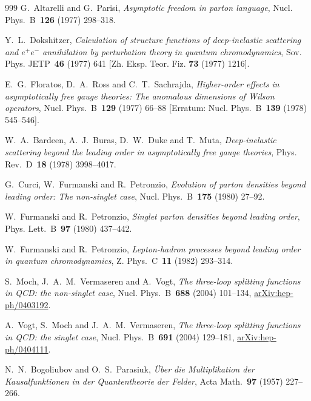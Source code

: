 \begin{thebibliography}{999}
G.~Altarelli and G.~Parisi, \emph{Asymptotic freedom in parton language}, Nucl. Phys.~B~\textbf{126} (1977) \mbox{298--318}.

Y.~L.~Dokshitzer, \emph{Calculation of structure functions of deep-inelastic scattering and $e^+e^-$ annihilation by perturbation theory in quantum chromodynamics}, Sov. Phys. JETP~\textbf{46} (1977) \mbox{641} [Zh. Eksp. Teor. Fiz. \textbf{73} (1977) \mbox{1216}].

E.~G.~Floratos, D.~A.~Ross and C.~T.~Sachrajda, \emph{Higher-order effects in asymptotically free gauge theories: The anomalous dimensions of Wilson operators}, Nucl. Phys.~B~\textbf{129} (1977) \mbox{66--88} [Erratum: Nucl. Phys.~B~\textbf{139} (1978) \mbox{545--546}].

W.~A.~Bardeen, A.~J.~Buras, D.~W.~Duke and T.~Muta, \emph{Deep-inelastic scattering beyond the leading order in asymptotically free gauge theories}, Phys. Rev.~D~\textbf{18} (1978) \mbox{3998--4017}.

G.~Curci, W.~Furmanski and R.~Petronzio, \emph{Evolution of parton densities beyond leading order: The non-singlet case}, Nucl. Phys.~B~\textbf{175} (1980) \mbox{27--92}.

W.~Furmanski and R.~Petronzio, \emph{Singlet parton densities beyond leading order}, Phys. Lett.~B~\textbf{97} (1980) \mbox{437--442}.

W.~Furmanski and R.~Petronzio, \emph{Lepton-hadron processes beyond leading order in quantum chromodynamics}, Z. Phys.~C~\textbf{11} (1982) \mbox{293--314}.

S.~Moch, J.~A.~M.~Vermaseren and A.~Vogt, \emph{The three-loop splitting functions in QCD: the non-singlet case}, Nucl. Phys.~B~\textbf{688} (2004) \mbox{101--134}, \href{https://arxiv.org/abs/hep-ph/0403192}{arXiv:hep-ph/0403192}.

A.~Vogt, S.~Moch and J.~A.~M.~Vermaseren, \emph{The three-loop splitting functions in QCD: the singlet case}, Nucl. Phys.~B~\textbf{691} (2004) \mbox{129--181}, \href{https://arxiv.org/abs/hep-ph/0404111}{arXiv:hep-ph/0404111}.

N.~N.~Bogoliubov and O.~S.~Parasiuk, \emph{{\"U}ber die Multiplikation der Kausalfunktionen in der Quantentheorie der Felder}, Acta Math.~\textbf{97} (1957) \mbox{227--266}.


\end{thebibliography}
